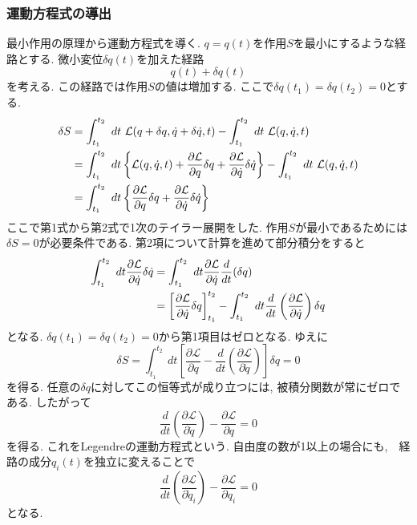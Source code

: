 \subsubsection{運動方程式の導出}
最小作用の原理から運動方程式を導く. 
$q=q(t)$を作用$S$を最小にするような経路とする.
微小変位$\delta q(t)$を加えた経路
\begin{equation}
 q(t) + \delta q(t)
\end{equation}
を考える.
この経路では作用$S$の値は増加する.
ここで$\delta q(t_{1}) = \delta q(t_{2}) = 0$とする.
\begin{align}
  \delta S
&=\int_{t_{1}}^{t_{2}} ~dt~ \mathcal{L} (q+\delta q, \dot{q} + \delta \dot{q}, t)
 -\int_{t_{1}}^{t_{2}} ~dt~ \mathcal{L} (q, \dot{q}, t)
 \notag
 \\
&=\int_{t_{1}}^{t_{2}} ~dt
  \left\{ \mathcal{L} (q, \dot{q}, t)
         +\frac{\partial \mathcal{L}}{\partial q} \delta q
         +\frac{\partial \mathcal{L}}{\partial \dot{q}} \delta \dot{q}
  \right\}
 -\int_{t_{1}}^{t_{2}} ~dt~ \mathcal{L} (q, \dot{q}, t)
 \notag
 \\
&=\int_{t_{1}}^{t_{2}}~dt
 \left\{
         \frac{\partial \mathcal{L}}{\partial q} \delta q
        +\frac{\partial \mathcal{L}}{\partial \dot{q}} \delta \dot{q}
 \right\}
 \notag
\end{align}
ここで第1式から第2式で1次のテイラー展開をした.
作用$S$が最小であるためには$\delta S = 0$が必要条件である.
第2項について計算を進めて部分積分をすると
\begin{align}
  \int_{t_{1}}^{t_{2}}~dt
  \frac{\partial \mathcal{L}}{\partial \dot{q}} \delta \dot{q}
&=\int_{t_{1}}^{t_{2}}~dt
  \frac{\partial \mathcal{L}}{\partial \dot{q}} \frac{d}{dt} (\delta q)
  \notag
  \\
&=\left[
  \frac{\partial \mathcal{L}}{\partial \dot{q}} \delta q
  \right]_{t_1}^{t_{2}}
 -\int_{t_{1}}^{t_{2}}~dt \frac{d}{dt}
  \left(\frac{\partial \mathcal{L}}{\partial \dot{q}}\right) \delta q
  \notag
\end{align}
となる.
$\delta q(t_{1}) = \delta q(t_{2}) = 0$から第1項目はゼロとなる.
ゆえに
\begin{equation}
 \delta S
=\int_{t_{1}}^{t_{2}} ~dt
 \left[
       \frac{\partial \mathcal{L}}{\partial q}
      -\frac{d}{dt}
       \left(\frac{\partial \mathcal{L}}{\partial \dot{q}} \right)
 \right] \delta q
=0
\end{equation}
を得る.
任意の$\delta q$に対してこの恒等式が成り立つには, 被積分関数が常にゼロである.
したがって
\begin{equation}
 \frac{d}{dt} \left( \frac{\partial \mathcal{L}}{\partial \dot{q}} \right)
-\frac{\partial \mathcal{L}}{\partial q}
=0
\end{equation}
を得る.
これをLegendreの運動方程式という.
自由度の数が1以上の場合にも,　経路の成分$q_{i}(t)$を独立に変えることで
\begin{equation}
  \frac{d}{dt} \left( \frac{\partial \mathcal{L}}{\partial \dot{q}_{i}} \right)
-\frac{\partial \mathcal{L}}{\partial q_{i}}
=0
\end{equation}
となる.

